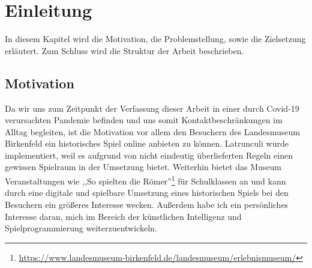 
\chapter{Einleitung}
\label{ch:Latrunculi}
In diesem Kapitel wird die Motivation, die Problemstellung, sowie die Zielsetzung erläutert. Zum Schluss wird die Struktur der Arbeit beschrieben.



\section{Motivation}
\label{ch:Einleitung:sec:Motivation}
Da wir uns zum Zeitpunkt der Verfassung dieser Arbeit in einer durch Covid-19 verursachten Pandemie befinden und uns somit Kontaktbeschränkungen im Alltag begleiten, ist die Motivation vor allem den Besuchern des Landesmuseum Birkenfeld ein historisches Spiel online anbieten zu können. Latrunculi wurde implementiert, weil es aufgrund von nicht eindeutig überlieferten Regeln einen gewissen Spielraum in der Umsetzung bietet. Weiterhin bietet das Museum Veranstaltungen wie ,,So spielten die Römer''\footnote[1]{\url{https://www.landesmuseum-birkenfeld.de/landesmuseum/erlebnismuseum/}} für Schulklassen an und kann durch eine digitale und spielbare Umsetzung  eines historischen Spiels bei den Besuchern ein größeres Interesse wecken. Außerdem habe ich ein persönliches Interesse daran, mich im Bereich der künstlichen Intelligenz und Spielprogrammierung weiterzuentwickeln.





